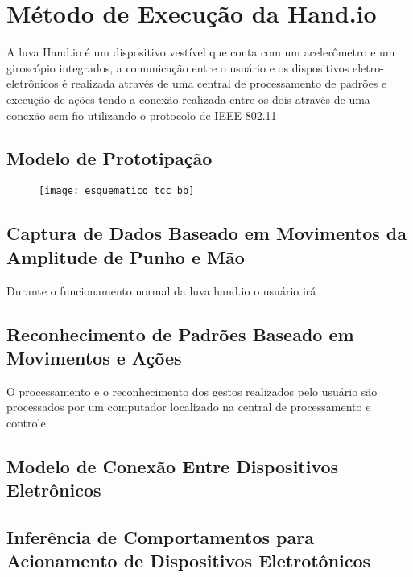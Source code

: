 \section{Método de Execução da Hand.io}

A luva Hand.io é um dispositivo vestível que conta com um acelerômetro e um giroscópio integrados, a comunicação entre o usuário e os dispositivos eletro-eletrônicos é realizada através de uma central de processamento de padrões e execução de ações tendo a conexão realizada entre os dois através de uma conexão sem fio utilizando o protocolo de IEEE 802.11 \cite{802.11:1997}




\subsection{Modelo de Prototipação}

\begin{figure}[h]
	\texttt{[image: esquematico\_tcc\_bb]}
    \centering
\end{figure}


\subsection{Captura de Dados Baseado em Movimentos da 
Amplitude de Punho e Mão}

Durante o funcionamento normal da luva hand.io o usuário irá 

\subsection{Reconhecimento de Padrões Baseado em Movimentos e Ações}

O processamento e o reconhecimento dos gestos realizados pelo usuário são processados por um computador localizado na central de processamento e controle

\subsection{Modelo de Conexão Entre Dispositivos Eletrônicos}

\subsection{Inferência de Comportamentos para Acionamento de Dispositivos Eletrotônicos}

